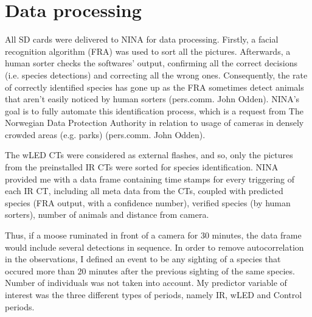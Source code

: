 

\begin{figure}
	\label{fig:map}
\end{figure}








\section{Data processing} %
All SD cards were delivered to NINA for data processing.
Firstly, a facial recognition algorithm (FRA) was used to sort all the pictures. %
Afterwards, a human sorter checks the softwares' output, confirming all the correct decisions (i.e. species detections) and correcting all the wrong ones. 
Consequently, the rate of correctly identified species has gone up as the FRA sometimes detect animals that aren't easily noticed by human sorters (pers.comm. John Odden). 
NINA's goal is to fully automate this identification process, which is a request from The Norwegian Data Protection Authority in relation to usage of cameras in densely crowded areas (e.g. parks) (pers.comm. John Odden).

The wLED CTs were considered as external flashes, and so, only the pictures from the preinstalled IR CTs were sorted for species identification.
NINA provided me with a data frame containing time stamps for every triggering of each IR CT, including all meta data from the CTs, coupled with predicted species (FRA output, with a confidence number), verified species (by human sorters), number of animals and distance from camera.

Thus, if a moose ruminated in front of a camera for 30 minutes, the data frame would include several detections in sequence.
In order to remove autocorrelation in the observations, I defined an event to be any sighting of a species that occured more than 20 minutes after the previous sighting of the same species.
Number of individuals was not taken into account.
My predictor variable of interest was the three different types of periods, namely IR, wLED and Control periods.

